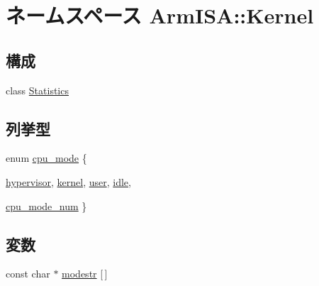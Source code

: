 \hypertarget{namespaceArmISA_1_1Kernel}{
\section{ネームスペース ArmISA::Kernel}
\label{namespaceArmISA_1_1Kernel}
}
\subsection*{構成}
\begin{DoxyCompactItemize}
\item 
class \hyperlink{classArmISA_1_1Kernel_1_1Statistics}{Statistics}
\end{DoxyCompactItemize}
\subsection*{列挙型}
\begin{DoxyCompactItemize}
\item 
enum \hyperlink{namespaceArmISA_1_1Kernel_aa1fc3805dac6f71f457fbbc263105bf6}{cpu\_\-mode} \{ \par
\hyperlink{namespaceArmISA_1_1Kernel_aa1fc3805dac6f71f457fbbc263105bf6a91b640fcbd5e0f6c8310b554caa00d4b}{hypervisor}, 
\hyperlink{namespaceArmISA_1_1Kernel_aa1fc3805dac6f71f457fbbc263105bf6adb0339d028e596254368234e5ab09f9d}{kernel}, 
\hyperlink{namespaceArmISA_1_1Kernel_aa1fc3805dac6f71f457fbbc263105bf6a04981b8c09a50ccfb1d92fc11b81c36a}{user}, 
\hyperlink{namespaceArmISA_1_1Kernel_aa1fc3805dac6f71f457fbbc263105bf6a0e9a37114c0e458d28d52f06ec0f2242}{idle}, 
\par
\hyperlink{namespaceArmISA_1_1Kernel_aa1fc3805dac6f71f457fbbc263105bf6a4572f7cf10830e04921c8896f22102ba}{cpu\_\-mode\_\-num}
 \}
\end{DoxyCompactItemize}
\subsection*{変数}
\begin{DoxyCompactItemize}
\item 
const char $\ast$ \hyperlink{namespaceArmISA_1_1Kernel_aaab5092bc6d1c40a90ff4c7450649ace}{modestr} \mbox{[}$\,$\mbox{]}
\end{DoxyCompactItemize}


